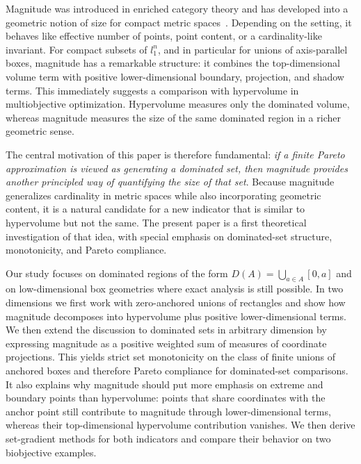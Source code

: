 \documentclass{article}
\def\ell{l}%
\theoremstyle{definition}
\newcommand{\1}{\mathbf{1}}
\begin{document}
Magnitude was introduced in enriched category theory and has developed into a geometric notion of size for compact metric spaces~\cite{Leinster2013,LeinsterMeckes2017,LeinsterTalk}. Depending on the setting, it behaves like effective number of points, point content, or a cardinality-like invariant. For compact subsets of $\ell_1^n$, and in particular for unions of axis-parallel boxes, magnitude has a remarkable structure: it combines the top-dimensional volume term with positive lower-dimensional boundary, projection, and shadow terms. This immediately suggests a comparison with hypervolume in multiobjective optimization. Hypervolume measures only the dominated volume, whereas magnitude measures the size of the same dominated region in a richer geometric sense.

The central motivation of this paper is therefore fundamental: \emph{if a finite Pareto approximation is viewed as generating a dominated set, then magnitude provides another principled way of quantifying the size of that set}. Because magnitude generalizes cardinality in metric spaces while also incorporating geometric content, it is a natural candidate for a new indicator that is similar to hypervolume but not the same. The present paper is a first theoretical investigation of that idea, with special emphasis on dominated-set structure, monotonicity, and Pareto compliance.

Our study focuses on dominated regions of the form $D(A)=\bigcup_{a\in A}[0,a]$ and on low-dimensional box geometries where exact analysis is still possible. In two dimensions we first work with zero-anchored unions of rectangles and show how magnitude decomposes into hypervolume plus positive lower-dimensional terms. We then extend the discussion to dominated sets in arbitrary dimension by expressing magnitude as a positive weighted sum of measures of coordinate projections. This yields strict set monotonicity on the class of finite unions of anchored boxes and therefore Pareto compliance for dominated-set comparisons. It also explains why magnitude should put more emphasis on extreme and boundary points than hypervolume: points that share coordinates with the anchor point still contribute to magnitude through lower-dimensional terms, whereas their top-dimensional hypervolume contribution vanishes. We then derive set-gradient methods for both indicators and compare their behavior on two biobjective examples.
\end{document}
